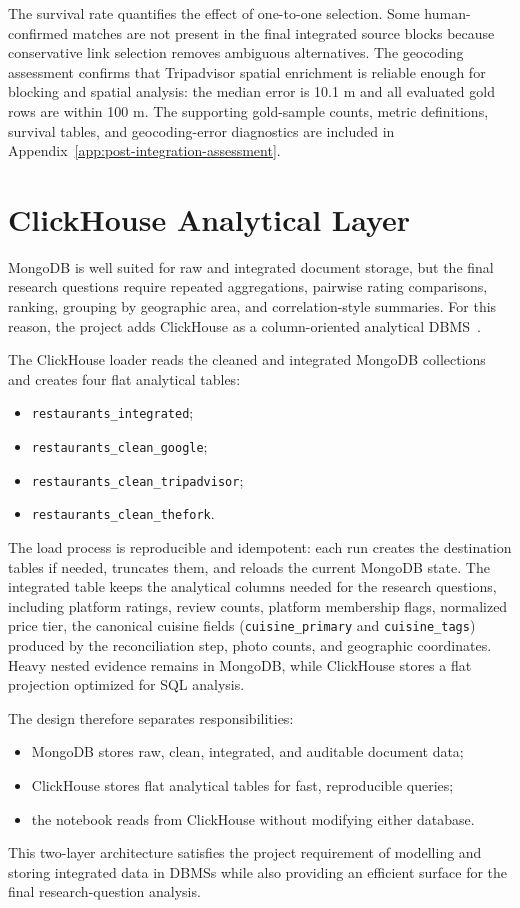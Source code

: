 The survival rate quantifies the effect of one-to-one selection. Some
human-confirmed matches are not present in the final integrated source blocks
because conservative link selection removes ambiguous alternatives. The geocoding
assessment confirms that Tripadvisor spatial enrichment is reliable enough for
blocking and spatial analysis: the median error is 10.1 m and all evaluated gold
rows are within 100 m. The supporting gold-sample counts, metric definitions,
survival tables, and geocoding-error diagnostics are included in
Appendix~\ref{app:post-integration-assessment}.

\section{ClickHouse Analytical Layer}

MongoDB is well suited for raw and integrated document storage, but the final
research questions require repeated aggregations, pairwise rating comparisons,
ranking, grouping by geographic area, and correlation-style summaries. For this
reason, the project adds ClickHouse as a column-oriented analytical DBMS~\cite{clickhouse}.

The ClickHouse loader reads the cleaned and integrated MongoDB collections and
creates four flat analytical tables:

\begin{itemize}
    \item \texttt{restaurants\_integrated};
    \item \texttt{restaurants\_clean\_google};
    \item \texttt{restaurants\_clean\_tripadvisor};
    \item \texttt{restaurants\_clean\_thefork}.
\end{itemize}

The load process is reproducible and idempotent: each run creates the destination
tables if needed, truncates them, and reloads the current MongoDB state. The
integrated table keeps the analytical columns needed for the research questions,
including platform ratings, review counts, platform membership flags, normalized
price tier, the canonical cuisine fields (\texttt{cuisine\_primary} and
\texttt{cuisine\_tags}) produced by the reconciliation step, photo counts, and
geographic coordinates. Heavy nested
evidence remains in MongoDB, while ClickHouse stores a flat projection optimized
for SQL analysis.

The design therefore separates responsibilities:

\begin{itemize}
    \item MongoDB stores raw, clean, integrated, and auditable document data;
    \item ClickHouse stores flat analytical tables for fast, reproducible queries;
    \item the notebook reads from ClickHouse without modifying either database.
\end{itemize}

This two-layer architecture satisfies the project requirement of modelling and
storing integrated data in DBMSs while also providing an efficient surface for the
final research-question analysis.
